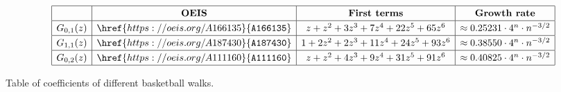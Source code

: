 \begin{table}[hbt!]
  \centering
  \[ \def\arraystretch{1.25}
    \begin{array}{|c|c|c|c|}
    \hline
    & \textbf{OEIS} & \textbf{First terms} & \textbf{Growth rate} \\ \hline
    G_{0,1}(z) & \href{https://oeis.org/A166135}{\texttt{A166135}} & z+z^2+3z^3+7z^4+22z^5+65z^6 & \approx 0.25231 \cdot 4^n \cdot n^{-3/2} \\ \hline
    G_{1,1}(z) & \href{https://oeis.org/A187430}{\texttt{A187430}} & 1+2z^2+2z^3+11z^4+24z^5+93z^6 & \approx 0.38550 \cdot 4^n \cdot n^{-3/2} \\ \hline
    G_{0,2}(z) & \href{https://oeis.org/A111160}{\texttt{A111160}} & z+z^2+4z^3+9z^4+31z^5+91z^6 & \approx 0.40825 \cdot 4^n \cdot n^{-3/2} \\ \hline
    \end{array}
  \]
  \caption{Table of coefficients of different basketball walks.}
  \label{table:basketball_walks}
\end{table}
